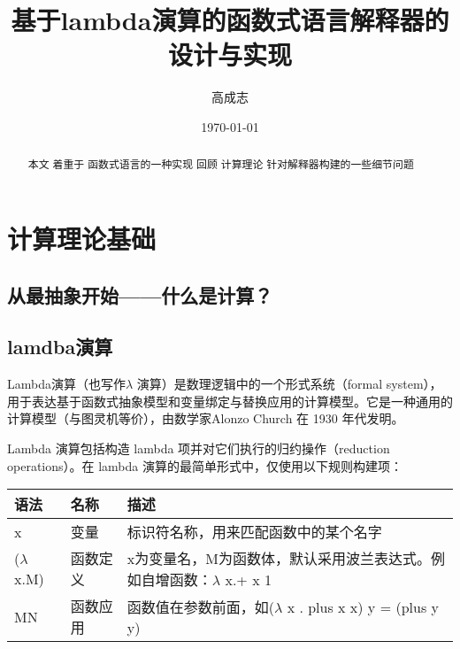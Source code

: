 \documentclass[UTF8]{ctexart}
\title{基于lambda演算的函数式语言解释器的设计与实现}
\author{高成志}
\date{\today}
\begin{document}
\maketitle
\newpage
\begin{abstract}
    本文 着重于 函数式语言的一种实现 回顾 计算理论 针对解释器构建的一些细节问题 
\end{abstract}
\newpage
\tableofcontents
\newpage


\section{计算理论基础}

\subsection{从最抽象开始——什么是计算？}



\subsection{lamdba演算}

Lambda演算（也写作$\lambda$ 演算）是数理逻辑中的一个形式系统（formal system），用于表达基于函数式抽象模型和变量绑定与替换应用的计算模型。它是一种通用的计算模型（与图灵机等价），由数学家Alonzo Church 在 1930 年代发明。

Lambda 演算包括构造 lambda 项并对它们执行的归约操作（reduction operations）。在 lambda 演算的最简单形式中，仅使用以下规则构建项：

\begin{table}[]
\begin{tabular}{lll}
\hline
语法  & 名称   & 描述        \\
\hline
x               & 变量    &   标识符名称，用来匹配函数中的某个名字\\
($\lambda$ x.M) & 函数定义 & x为变量名，M为函数体，默认采用波兰表达式。例如自增函数：$\lambda$ x.+ x 1\\
MN              & 函数应用 &函数值在参数前面，如($\lambda$ x . plus x x) y = (plus y y) \\
\hline
\end{tabular}
\end{table} 


\subsubsection{}
\end{document}
